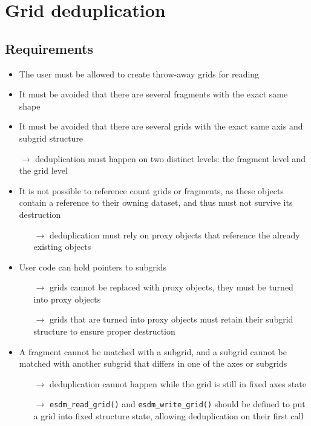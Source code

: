\section{Grid deduplication}
\subsection{Requirements}

\begin{itemize}
  \item The user must be allowed to create throw-away grids for reading
  \item It must be avoided that there are several fragments with the exact same shape
  \item It must be avoided that there are several grids with the exact same axis and subgrid structure
  \item[$\rightarrow$] deduplication must happen on two distinct levels: the fragment level and the grid level
  \item It is not possible to reference count grids or fragments, as these objects contain a reference to their owning dataset, and thus must not survive its destruction
    \begin{itemize}
      \item[$\rightarrow$] deduplication must rely on proxy objects that reference the already existing objects
    \end{itemize}
  \item User code can hold pointers to subgrids
    \begin{itemize}
      \item[$\rightarrow$] grids cannot be replaced with proxy objects, they must be turned into proxy objects
      \item[$\rightarrow$] grids that are turned into proxy objects must retain their subgrid structure to ensure proper destruction
    \end{itemize}
  \item A fragment cannot be matched with a subgrid, and a subgrid cannot be matched with another subgrid that differs in one of the axes or subgrids
    \begin{itemize}
      \item[$\rightarrow$] deduplication cannot happen while the grid is still in fixed axes state
      \item[$\rightarrow$] \lstinline|esdm_read_grid()| and \lstinline|esdm_write_grid()| should be defined to put a grid into fixed structure state, allowing deduplication on their first call
    \end{itemize}
\end{itemize}



